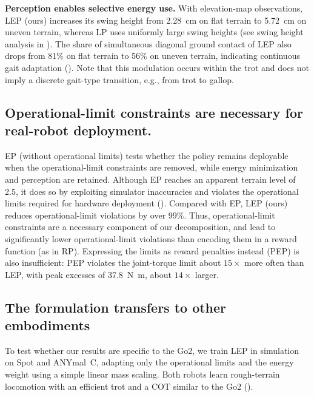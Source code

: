 \documentclass{article}
\newcommand{\baselineTwo}{LP}
\newcommand{\baselineFour}{LEP}
\newcommand{\baselineFive}{RP}
\newcommand{\baselineSix}{EP}
\begin{document}
    \textbf{Perception enables selective energy use.} With elevation-map observations, \baselineFour{} (ours) increases its swing height from \SI{2.28}{\centi\meter} on flat terrain to \SI{5.72}{\centi\meter} on uneven terrain, whereas \baselineTwo{} uses uniformly large swing heights (see swing height analysis in ). The share of simultaneous diagonal ground contact of \baselineFour{} also drops from 81\% on flat terrain to 56\% on uneven terrain, indicating continuous gait adaptation (). Note that this modulation occurs within the trot and does not imply a discrete gait-type transition, e.g., from trot to gallop.
	
    \subsection{Operational-limit constraints are necessary for real-robot deployment.}
    \label{sec:safety-and-constraint-behavior}
    
    \baselineSix{} (without operational limits) tests whether the policy remains deployable when the operational-limit constraints are removed, while energy minimization and perception are retained. 
    Although \baselineSix{} reaches an apparent terrain level of 2.5, it does so by exploiting simulator inaccuracies and violates the operational limits required for hardware deployment ().
    Compared with \baselineSix{}, \baselineFour{} (ours) reduces operational-limit violations by over \(99\%\).
    Thus, operational-limit constraints are a necessary component of our decomposition, and lead to significantly lower operational-limit violations than encoding them in a reward function (as in \baselineFive{}). Expressing the limits as reward penalties instead (PEP) is also insufficient: PEP violates the joint-torque limit about \(15\times\) more often than \baselineFour{}, with peak excesses of \SI{37.8}{\newton\meter}, about \(14\times\) larger.

    \subsection{The formulation transfers to other embodiments}
    \label{sec:results-embodiments}
    To test whether our results are specific to the Go2, we train \baselineFour{} in simulation on Spot and ANYmal~C, adapting only the operational limits and the energy weight using a simple linear mass scaling. Both robots learn rough-terrain locomotion with an efficient trot and a COT similar to the Go2 ().
\end{document}
